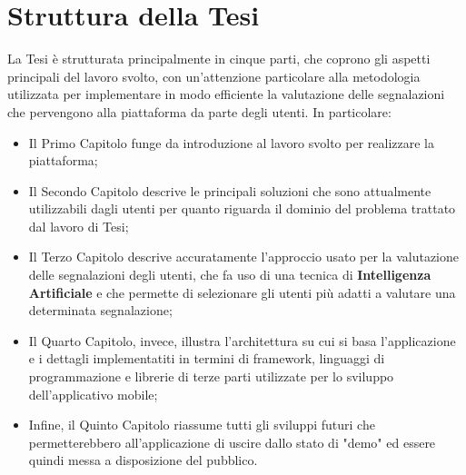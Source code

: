         \newpage

\section{Struttura della Tesi}
        La Tesi è strutturata principalmente in cinque parti, che coprono gli aspetti principali del lavoro svolto, con un'attenzione particolare alla metodologia utilizzata per implementare in modo efficiente la valutazione delle segnalazioni che pervengono alla piattaforma da parte degli utenti. In particolare:
        \begin{itemize}
            \item Il Primo Capitolo funge da introduzione al lavoro svolto per realizzare la piattaforma;
            \item Il Secondo Capitolo descrive le principali soluzioni che sono attualmente utilizzabili dagli utenti per quanto riguarda il dominio del problema trattato dal lavoro di Tesi;
            \item Il Terzo Capitolo descrive accuratamente l'approccio usato per la valutazione delle segnalazioni degli utenti, che fa uso di una tecnica di \textbf{Intelligenza Artificiale} e che permette di selezionare gli utenti più adatti a valutare una determinata segnalazione;
            \item Il Quarto Capitolo, invece, illustra l'architettura su cui si basa l'applicazione e i dettagli implementatiti in termini di framework, linguaggi di programmazione e librerie di terze parti utilizzate per lo sviluppo dell'applicativo mobile;
            \item Infine, il Quinto Capitolo riassume tutti gli sviluppi futuri che permetterebbero all'applicazione di uscire dallo stato di "demo" ed essere quindi messa a disposizione del pubblico.
        \end{itemize}
